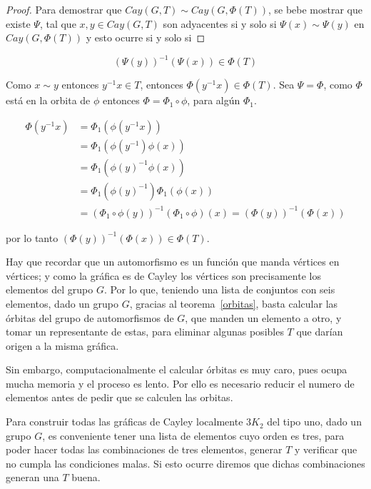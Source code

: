 \documentclass[11pt]{book}
\theoremstyle{definition}
\begin{document}
\begin{proof} Para demostrar que $Cay(G,T)\sim Cay(G,\Phi(T))$, se
bebe mostrar que existe $\Psi$, tal que $x,y\in Cay(G,T)$ son
adyacentes si y solo si $\Psi(x)\sim \Psi(y)$ en $Cay(G,\Phi(T))$ y
esto ocurre si y solo si
\end{proof}

\begin{equation*}
  (\Psi(y))^{-1}(\Psi(x))\in \Phi(T)
\end{equation*}

Como $x\sim y$ entonces $y^{-1}x\in T$, entonces $\Phi(y^{-1}x) \in
\Phi(T)$. Sea $\Psi=\Phi$, como $\Phi$ está en la orbita de $\phi$
entonces $\Phi=\Phi_1\circ\phi$, para algún $\Phi_1$.

\begin{equation*}
  \begin{split}
    \Phi(y^{-1}x)&=\Phi_1(\phi(y^{-1}x))\\
    &=\Phi_1(\phi(y^{-1})\phi(x))\\
    &=\Phi_1({\phi(y)}^{-1}\phi(x))\\
    &=\Phi_1({\phi(y)}^{-1})\Phi_1(\phi(x))\\
    &=({\Phi_1\circ \phi(y)})^{-1}(\Phi_1\circ
    \phi)(x)=(\Phi(y))^{-1}(\Phi(x))
  \end{split}
\end{equation*}

por lo tanto $(\Phi(y))^{-1}(\Phi(x))\in \Phi(T)$. 

Hay que recordar que un automorfismo es un función que manda vértices
en vértices; y como la gráfica es de Cayley los vértices son
precisamente los elementos del grupo $G$. Por lo que, teniendo una
lista de conjuntos con seis elementos, dado un grupo $G$, gracias al
teorema~\ref{orbitas}, basta calcular las órbitas del grupo de
automorfismos de $G$, que manden un elemento a otro, y tomar un
representante de estas, para eliminar algunas posibles $T$ que darían
origen a la misma gráfica.

Sin embargo, computacionalmente el calcular órbitas es muy caro, pues
ocupa mucha memoria y el proceso es lento. Por ello es necesario
reducir el numero de elementos antes de pedir que se calculen las
orbitas.

Para construir todas las gráficas de Cayley localmente $3K_2$ del tipo
uno, dado un grupo $G$, es conveniente tener una lista de elementos
cuyo orden es tres, para poder hacer todas las combinaciones de tres
elementos, generar $T$ y verificar que no cumpla las condiciones
malas. Si esto ocurre diremos que dichas combinaciones generan una $T$
buena.
\end{document}
